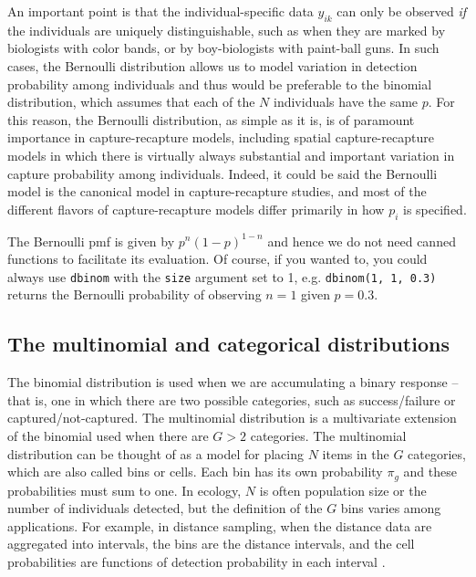 An important point is that the individual-specific data $y_{ik}$ can only be
observed  {\it if} the individuals are uniquely distinguishable, such as when they
are marked by biologists with color bands, or by boy-biologists with
paint-ball guns.
In such cases, the Bernoulli distribution allows us to
model variation in detection probability among individuals and thus
would be preferable to the binomial distribution, which assumes that each
of the $N$ individuals have the same $p$.
For this reason, the Bernoulli
distribution, as simple as it is, is of paramount importance in
capture-recapture models, including spatial capture-recapture models
in which there is virtually always substantial and important variation in capture probability
among individuals. Indeed, it could be said the Bernoulli model is the
canonical model in capture-recapture studies, and most of the
different flavors of capture-recapture models differ primarily in how $p_i$ is
specified. %

The Bernoulli pmf is given by  $p^n(1-p)^{1-n}$ and hence we do not need canned
functions to facilitate its evaluation. Of course, if you wanted to, you
could always use \verb+dbinom+ with the \verb+size+ argument set to
1, e.g. \verb+dbinom(1, 1, 0.3)+ returns the Bernoulli probability of
observing $n=1$ given $p=0.3$.

\subsection{The multinomial and categorical distributions}
\label{modeling.sec.multinom}

The binomial distribution is used
when we are accumulating a binary response -- that is, one in which
there are two possible categories, such as success/failure or
captured/not-captured.
The multinomial distribution is a multivariate extension of
the binomial used when there are $G>2$ categories.
The multinomial distribution can be thought of as a model for placing
$N$ items in the $G$ categories, which are also called bins or cells. Each bin has
its own probability $\pi_g$ and these probabilities must sum to one.
In ecology, $N$ is often population size or the number of individuals
detected, but the definition of the $G$ bins varies among
applications. For example, in distance sampling, when the distance
data are aggregated into intervals,
the bins are the distance intervals, and the cell probabilities are
functions of detection probability in each interval \citep{royle_etal:2004}.

